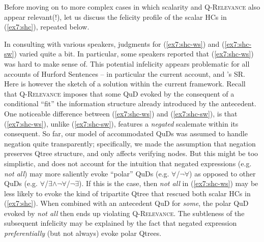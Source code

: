 Before moving on to more complex cases in which scalarity and \textsc{Q-Relevance} also appear relevant(!), let us discuss the felicity profile of the scalar HCs in (\ref{ex7:shc}), repeated below.

\begin{exe}
	\begin{xlist}
	\end{xlist}
\end{exe}

In consulting with various speakers, judgments for (\ref{ex7:shc-ws}) and (\ref{ex7:shc-sw}) varied quite a bit. In particular, some speakers reported that (\ref{ex7:shc-ws}) was hard to make sense of. This potential infelicity appears problematic for all accounts of Hurford Sentences -- in particular the current account, and \citet{Kalomoiros2024}'s SR. Here is however the sketch of a solution within the current framework. Recall that \textsc{Q-Relevance} imposes that some QuD evoked by the consequent of a conditional ``fit'' the information structure already introduced by the antecedent. One noticeable difference between (\ref{ex7:shc-ws}) and (\ref{ex7:shc-sw}), is that (\ref{ex7:shc-ws}), unlike (\ref{ex7:shc-sw}), features a \textit{negated} scalemate within its consequent. So far, our model of accommodated QuDs was assumed to handle negation quite transparently; specifically, we made the assumption that negation preserves Qtree structure, and only affects verifying nodes. But this might be too simplistic, and does not account for the intuition that negated expressions (e.g. \textit{not all}) may more saliently evoke ``polar'' QuDs (e.g. $\forall$/$\neg\forall$) as opposed to other QuDs (e.g. $\forall$/$\exists\wedge\neg\forall$/$\neg\exists$). If this is the case, then \textit{not all} in (\ref{ex7:shc-ws}) may be less likely to evoke the kind of tripartite Qtree that rescued both scalar HCs in (\ref{ex7:shc}). When combined with an antecedent QuD for \textit{some}, the polar QuD evoked by \textit{not all} then ends up violating \textsc{Q-Relevance}. The subtleness of the subsequent infelicity may be explained by the fact that negated expression \textit{preferentially} (but not always) evoke polar Qtrees.\\

